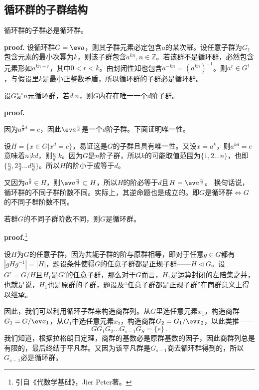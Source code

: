 \subsection{循环群的子群结构}
\begin{theorem}{}\label{the_cyclic_1}
循环群的子群必是循环群。
\end{theorem}
\textbf{proof.}
设循环群$G=\ev a$，则其子群元素必定包含$a$的某次幂。设任意子群为$G_1$包含元素的最小次幂为$k$，则该子群包含$a^{kn},n\in \mathbb Z$。若该群不是循环群，必然包含元素形如$a^{kn+r}$，其中$0< r<k$。由封闭性知也包含$a^{-kn}=(a^{kn})^{-1}$。则$a^{r}\in G^{1}$，与假设里$k$是最小正整数矛盾，所以循环群的子群必是循环群。
\begin{theorem}{}
设$G$是$n$元循环群，若$d|n$，则$G$内存在唯一一个$d$阶子群。
\end{theorem}
\textbf{proof.}

因为$a^{\frac{n}{d}d}=e$，因此$\ev a^{\frac{n}{d}}$是一个$d$阶子群。下面证明唯一性。

设$H=\{x\in G|x^d=e\}$，易证这是$G$的子群且具有唯一性。又设$x=a^k$，则$a^{kd}=e$意味着$n|kd$，则$\frac{n}{d}|k$。因为$G$是$n$阶子群，所以$k$的可能取值范围为$\{1,2...n\}$，也即$\{\frac{n}{d},2\frac{n}{d}...d\frac{n}{d}\}$。所以$H$的阶小于或等于$d$。

又因为$a^{\frac{n}{d}}\in H$，则$\ev a^{\frac{n}{d}}\subset H$，所以$H$的阶必等于$d$且$H=\ev a^{\frac{n}{d}}$。
换句话说，循环群的不同子群阶数不同。实际上，其逆命题也是成立的。即$G$是循环群$\Longleftrightarrow G$的不同子群阶数不同。
\begin{theorem}{}\label{the_cyclic_2}
若群$G$的不同子群阶数不同，则$G$是循环群。
\end{theorem}
\textbf{proof.}\footnote{引自《代数学基础》，Jier Peter著。}

设$H$为$G$的任意子群，因为共轭子群的阶与原群相等，即对于任意$g\in G$都有$|gHg^{-1}|=|H|$，题设条件使得$G$的任意子群都是正规子群——$H\lhd G$。设$G'=G/H$且$H_1$是$G'$的任意子群，那么对于$G$而言，$H_1$是运算封闭的左陪集之并，也就是说，$H_1$也是原群的子群，题设及“任意子群都是正规子群”在商群意义上得以继承。

因此，我们可以利用循环子群来构造商群列。从$G$里选任意元素$x_1$，构造商群$G_1=G/\ev x_1$，从$G_1$中选任意元素$x_2$，构造商群$G_2=G_1/\ev x_2$，以此类推——
\begin{equation}
GG_1G_2...G_{s-1}G_S=\{e\}~.
\end{equation}
我们知道，根据拉格朗日定理，商群的基数必是原群基数的因子，因此商群列总是有限的，最后终结于平凡群。又因为该平凡群是$G_{s-1}$商去循环群得到的，所以$G_{s-1}$必是循环群。

